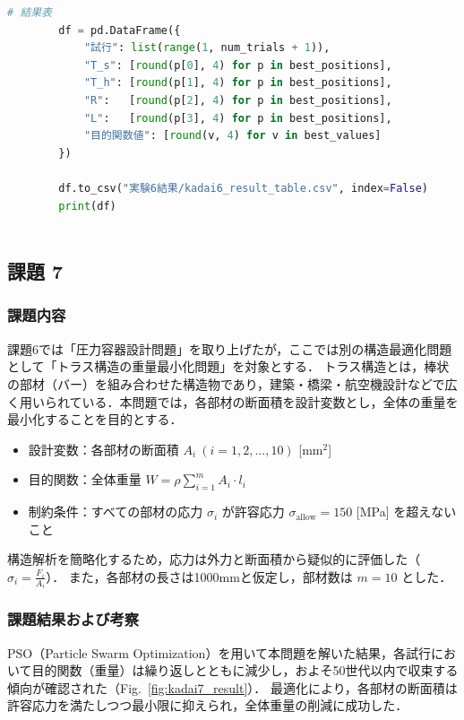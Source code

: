 \begin{lstlisting}[language=Python, caption=PSOによる圧力容器設計の最適化コード抜粋, label=lst:kadai6_code]
        # 結果表
        df = pd.DataFrame({
            "試行": list(range(1, num_trials + 1)),
            "T_s": [round(p[0], 4) for p in best_positions],
            "T_h": [round(p[1], 4) for p in best_positions],
            "R":   [round(p[2], 4) for p in best_positions],
            "L":   [round(p[3], 4) for p in best_positions],
            "目的関数値": [round(v, 4) for v in best_values]
        })
    
        df.to_csv("実験6結果/kadai6_result_table.csv", index=False)
        print(df)
    
\end{lstlisting}


\subsection{課題 7}

\subsubsection{課題内容}

課題6では「圧力容器設計問題」を取り上げたが，ここでは別の構造最適化問題として「トラス構造の重量最小化問題」を対象とする．\cite{pso_truss} 
トラス構造とは，棒状の部材（バー）を組み合わせた構造物であり，建築・橋梁・航空機設計などで広く用いられている．本問題では，各部材の断面積を設計変数とし，全体の重量を最小化することを目的とする．

\begin{itemize}
  \item 設計変数：各部材の断面積 $A_i \ (i = 1, 2, ..., 10)$ [mm$^2$]
  \item 目的関数：全体重量 $W = \rho \sum_{i=1}^{m} A_i \cdot l_i$
  \item 制約条件：すべての部材の応力 $\sigma_i$ が許容応力 $\sigma_{\text{allow}} = 150$ [MPa] を超えないこと
\end{itemize}

構造解析を簡略化するため，応力は外力と断面積から疑似的に評価した（$\sigma_i = \frac{F_i}{A_i}$）．  
また，各部材の長さは1000mmと仮定し，部材数は $m=10$ とした．


\subsubsection{課題結果および考察}

PSO（Particle Swarm Optimization）を用いて本問題を解いた結果，各試行において目的関数（重量）は繰り返しとともに減少し，およそ50世代以内で収束する傾向が確認された（Fig.~\ref{fig:kadai7_result}）．  
最適化により，各部材の断面積は許容応力を満たしつつ最小限に抑えられ，全体重量の削減に成功した．


